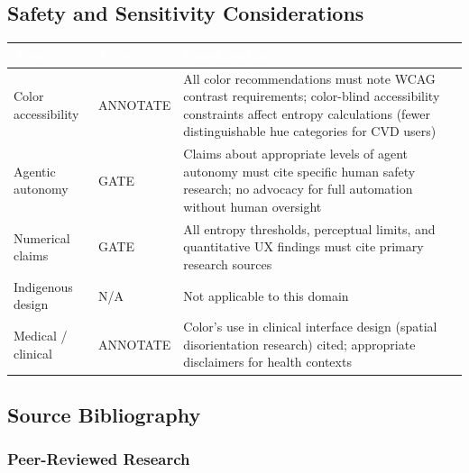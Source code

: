 \documentclass[11pt,letterpaper]{article}
\newcommand{\tableheader}[1]{\textbf{\sffamily\textcolor{white}{#1}}}
\begin{document}
\subsection{Safety and Sensitivity Considerations}

\begin{center}
\begin{tabularx}{\textwidth}{L{3cm}L{2.5cm}X}
\toprule
{}
\tableheader{Area} & \tableheader{Type} & \tableheader{Consideration} \\
\midrule
Color accessibility & ANNOTATE & All color recommendations must note WCAG contrast requirements; color-blind accessibility constraints affect entropy calculations (fewer distinguishable hue categories for CVD users) \\
Agentic autonomy & GATE & Claims about appropriate levels of agent autonomy must cite specific human safety research; no advocacy for full automation without human oversight \\
Numerical claims & GATE & All entropy thresholds, perceptual limits, and quantitative UX findings must cite primary research sources \\
Indigenous design & N/A & Not applicable to this domain \\
Medical / clinical & ANNOTATE & Color's use in clinical interface design (spatial disorientation research) cited; appropriate disclaimers for health contexts \\
\bottomrule
\end{tabularx}
\end{center}

\subsection{Source Bibliography}

\subsubsection{Peer-Reviewed Research}
\end{document}
